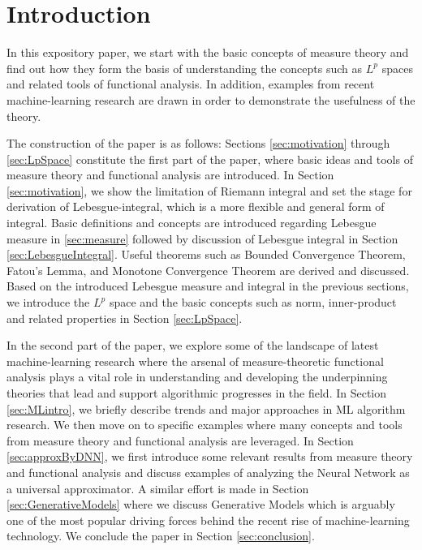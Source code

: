 \documentclass[12pt]{amsart}
\theoremstyle{plain}
\theoremstyle{definition}
\theoremstyle{remark}
\numberwithin{equation}{section}
\numberwithin{thm}{section}
\begin{document}
\section{\textbf{Introduction}}
In this expository paper, we start with the basic concepts of measure theory and find out how they form the basis of understanding the concepts such as $L^p$ spaces and related tools of functional analysis. In addition, examples from recent machine-learning research are drawn in order to demonstrate the usefulness of the theory.

The construction of the paper is as follows: Sections \ref{sec:motivation} through \ref{sec:LpSpace} constitute the first part of the paper, where basic ideas and tools of measure theory and functional analysis are introduced. In Section \ref{sec:motivation}, we show the limitation of Riemann integral and set the stage for derivation of Lebesgue-integral, which is a more flexible and general form of integral. Basic definitions and concepts are introduced regarding Lebesgue measure in \ref{sec:measure} followed by discussion of Lebesgue integral in Section \ref{sec:LebesgueIntegral}. Useful theorems such as Bounded Convergence Theorem, Fatou’s Lemma, and Monotone Convergence Theorem are derived and discussed. Based on the introduced Lebesgue measure and integral in the previous sections, we introduce the $L^p$ space and the basic concepts such as norm, inner-product and related properties in Section \ref{sec:LpSpace}. 

  

In the second part of the paper, we explore some of the landscape of latest machine-learning research where the arsenal of measure-theoretic functional analysis plays a vital role in understanding and developing the underpinning theories that lead and support algorithmic progresses in the field.
In Section \ref{sec:MLintro}, we briefly describe trends and major approaches in ML algorithm research. We then move on to specific examples where many concepts and tools from measure theory and functional analysis are leveraged. In Section \ref{sec:approxByDNN}, we first introduce some relevant results from measure theory and functional analysis and discuss examples of analyzing the Neural Network as a universal approximator. A similar effort is made in Section \ref{sec:GenerativeModels} where we discuss Generative Models which is arguably one of the most popular driving forces behind the recent rise of machine-learning technology. We conclude the paper in Section \ref{sec:conclusion}.
\end{document}
